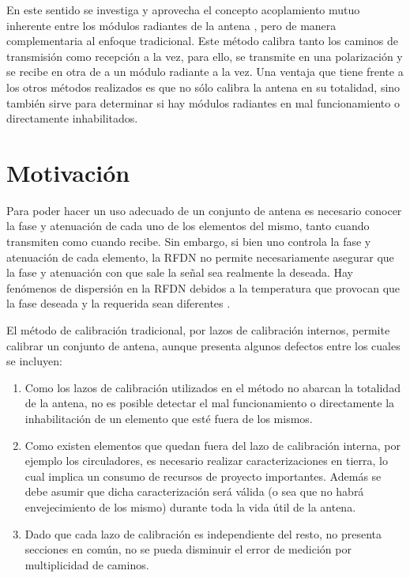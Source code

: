 En este sentido se investiga y aprovecha el concepto acoplamiento mutuo inherente entre los módulos radiantes de la antena
\cite{Aumann1989}, pero de manera complementaria al enfoque tradicional. Este método calibra tanto los caminos de transmisión
como recepción a la vez, para ello, se transmite en una polarización y se recibe en otra de a un módulo radiante a la vez.
Una ventaja que tiene frente a los otros métodos realizados es que no sólo calibra la antena en su totalidad, sino también
sirve para determinar si hay módulos radiantes en mal funcionamiento o directamente inhabilitados.


\section{Motivación} \label{sc:motivation}

Para poder hacer un uso adecuado de un conjunto de antena es necesario conocer la fase y atenuación de cada uno de los elementos
del mismo, tanto cuando transmiten como cuando recibe. Sin embargo, si bien uno controla la fase y atenuación de cada elemento,
la RFDN no permite necesariamente asegurar que la fase y atenuación con que sale la señal sea realmente la deseada. Hay 
fenómenos de dispersión en la RFDN debidos a la temperatura que provocan que la fase deseada y la requerida sean diferentes 
\cite{Keizer2011}.

El método de calibración tradicional, por lazos de calibración internos, permite calibrar un conjunto de antena, aunque
presenta algunos defectos entre los cuales se incluyen:

\begin{enumerate}
    \item Como los lazos de calibración utilizados en el método no abarcan la totalidad de la antena, no es posible detectar el
		mal funcionamiento o directamente la inhabilitación de un elemento que esté fuera de los mismos. 
    \item Como existen elementos que quedan fuera del lazo de calibración interna, por ejemplo los circuladores, es necesario
		realizar caracterizaciones en tierra, lo cual implica un consumo de recursos de proyecto importantes. Además se debe 
		asumir que dicha caracterización será válida (o sea que no habrá envejecimiento de los mismo) durante toda la vida útil
		de la antena.
    \item Dado que cada lazo de calibración es independiente del resto, no presenta secciones en común, no se pueda disminuir
		el error de medición por multiplicidad de caminos.
\end{enumerate}


